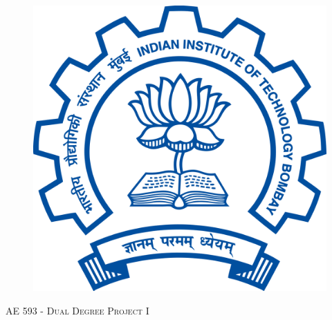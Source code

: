\documentclass[
11pt, %
oneside, %
english, %
singlespacing, %
liststotoc, %
headsepline, %
]{MastersDoctoralThesis} %
\author{K T Prajwal Prathiksh} %
\begin{document}
\frontmatter %

\pagestyle{plain} %


\begin{titlepage}
\begin{center}


\begin{figure}[H]
\centering
\includegraphics[scale=0.12]{Figures/iitb-logo}
\end{figure}

\vspace*{.06\textheight}
{\scshape\LARGE \univname\par}\vspace{1.5cm} %
\textsc{\Large AE 593 - Dual Degree Project I }\\[0.5cm] %

\HRule \\[0.4cm] %
{\huge \bfseries \ttitle\par}\vspace{0.4cm} %
\HRule \\[1.5cm] %
 

\end{center}
\end{titlepage}
\end{document}
